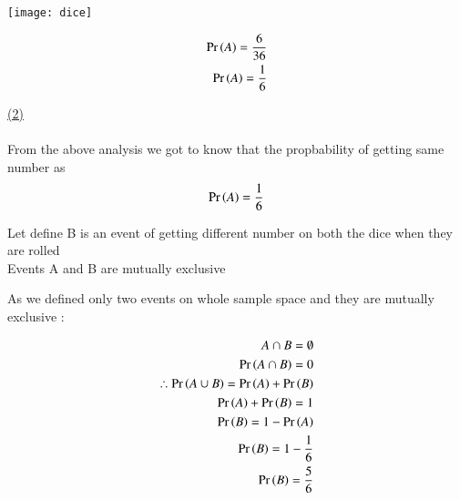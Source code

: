 \documentclass[journal,12pt,twocolumn]{IEEEtran}
\begin{document}
    \texttt{[image: dice]}

    \begin{align*}
        \Pr\left(A\right)=\frac{6}{36}\\
        \Pr\left(A\right)=\frac{1}{6}
   \end{align*}


   \underline {(2)} \\ \\

   \noindent From the above analysis we got to know that the propbability of getting same number as 
   \begin{align*}
    \Pr\left(A\right)=\frac{1}{6}
\end{align*}

\noindent Let define {B} i\noindent s an event of getting different number on both the dice when they are rolled\\
Events {A} and {B} are mutually exclusive 

\noindent As we defined only two events on whole sample space and they are mutually exclusive  $ \colon $ 

\begin{align*}
 {A \cap B = \emptyset} \\
 \Pr\left(A \cap B\right)={0}\\
 \therefore \Pr\left(A \cup B\right)=\Pr\left(A\right)+\Pr\left(B\right)\\
 \Pr\left(A\right) + \Pr\left(B\right) = {1} \\
 \Pr\left(B\right) = {1}-\Pr\left(A\right) \\
 \Pr\left(B\right)={1}-\frac{1}{6}\\
 \Pr\left(B\right)=\frac{5}{6}
\end{align*}
\end{document}
